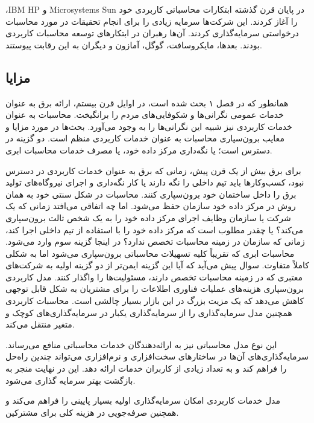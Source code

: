 \documentclass{book}
\begin{document}
            ،IBM HP و Microsystems Sun در پایان قرن گذشته ابتکارات محاسباتی کاربردی خود را آغاز کردند. این شرکت‌ها سرمایه زیادی را برای انجام تحقیقات در مورد محاسبات درخواستی سرمایه‌گذاری کردند. آن‌ها رهبران در ابتکارهای توسعه محاسبات کاربردی بودند. بعدها، مایکروسافت، گوگل، آمازون و دیگران به این رقابت پیوستند.

            \subsection{مزایا}

                همانطور که در فصل ۱ بحث شده است، در اوایل قرن بیستم، ارائه برق به عنوان خدمات عمومی نگرانی‌ها و شکوفایی‌های مردم را برانگیخت. محاسبات به عنوان خدمات کاربردی نیز شبیه این نگرانی‌ها را به وجود می‌آورد. بحث‌ها در مورد مزایا و معایب برون‌سپاری محاسبات به عنوان خدمات کاربردی منظم است. دو گزینه در دسترس است؛ یا نگه‌داری مرکز داده خود، یا مصرف خدمات محاسبات ابری.

                برای برق بیش از یک قرن پیش، زمانی که برق به عنوان خدمات کاربردی در دسترس نبود، کسب‌وکارها باید تیم داخلی را نگه دارند یا کار نگه‌داری و اجرای نیروگاه‌های تولید برق را داخل ساختمان خود برون‌سپاری کنند. محاسبات در شکل سنتی خود به همان روش در مرکز داده خود سازمان حفظ می‌شود. اما چه اتفاقی می‌افتد زمانی که یک شرکت یا سازمان وظایف اجرای مرکز داده خود را به یک شخص ثالث برون‌سپاری می‌کند؟ یا چقدر مطلوب است که مرکز داده خود را با استفاده از تیم داخلی اجرا کند، زمانی که سازمان در زمینه محاسبات تخصص ندارد؟ در اینجا گزینه سوم وارد می‌شود. محاسبات ابری که تقریباً کلیه تسهیلات محاسباتی برون‌سپاری می‌شود اما به شکلی کاملاً متفاوت. سوال پیش می‌آید که آیا این گزینه ایمن‌تر از دو گزینه اولیه به شرکت‌های معتبری که در زمینه محاسبات تخصص دارند، مسئولیت‌ها را واگذار کنند. مدل کاربردی برون‌سپاری هزینه‌های عملیات فناوری اطلاعات را برای مشتریان به شکل قابل توجهی کاهش می‌دهد که یک مزیت بزرگ در این بازار بسیار چالشی است. محاسبات کاربردی همچنین مدل سرمایه‌گذاری را از سرمایه‌گذاری یکبار در سرمایه‌گذاری‌های کوچک و متغیر منتقل می‌کند.
            
                این نوع مدل محاسباتی نیز به ارائه‌دهندگان خدمات محاسباتی منافع می‌رساند. سرمایه‌گذاری‌های آن‌ها در ساختارهای سخت‌افزاری و نرم‌افزاری می‌تواند چندین راه‌حل را فراهم کند و به تعداد زیادی از کاربران خدمات ارائه دهد. این در نهایت منجر به بازگشت بهتر سرمایه گذاری می‌شود.

                \begin{addinfo}
                    
                    مدل خدمات کاربردی امکان سرمایه‌گذاری اولیه بسیار پایینی را فراهم می‌کند و همچنین صرفه‌جویی در هزینه کلی برای مشترکین.

                \end{addinfo}
\end{document}
